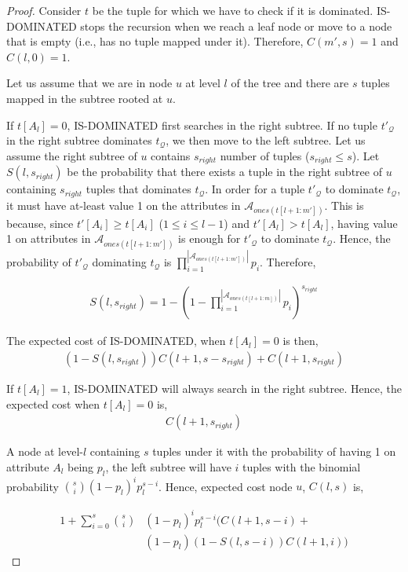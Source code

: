\begin{proof}
Consider $t$ be the tuple for which we have to check if it is dominated. IS-DOMINATED stops the recursion when we reach a leaf node or move to a node that is empty (i.e., has no tuple mapped under it). Therefore, $C(m', s) = 1$ and $C(l, 0) = 1$.

Let us assume that we are in node $u$ at level $l$ of the tree and there are $s$ tuples mapped in the subtree rooted at $u$. 

If $t[A_l] = 0$, IS-DOMINATED first searches in the right subtree. If no tuple $t'_\mathcal{Q}$ in the right subtree dominates $t_\mathcal{Q}$, we then move to the left subtree. Let us assume the right subtree of $u$ contains $s_{right}$ number of tuples ($s_{right} \leq s$). Let $S(l, s_{right})$ be the probability that there exists a tuple in the right subtree of $u$ containing $s_{right}$ tuples that dominates $t_\mathcal{Q}$. In order for a tuple $t'_\mathcal{Q}$ to dominate $t_\mathcal{Q}$, it must have at-least value 1 on the attributes in $\mathcal{A}_{ones(t[l+1:m'])}$. This is because, since $t'[A_i] \geq t[A_i]$ ($1 \leq i \leq l-1$) and $t'[A_l] > t[A_l]$, having value 1 on attributes in $\mathcal{A}_{ones(t[l+1:m'])}$ is enough for $t'_\mathcal{Q}$ to dominate $t_\mathcal{Q}$. Hence, the probability of $t'_\mathcal{Q}$ dominating $t_\mathcal{Q}$ is $\prod\nolimits_{i=1}^{|\mathcal{A}_{ones(t[l+1:m'])}|}p_i$. Therefore,

\begin{align}
    S(l, s_{right}) = 1 - (1 - \prod\nolimits_{i=1}^{|\mathcal{A}_{ones(t[l+1:m])}|}p_i)^{s_{right}}
\end{align}

The expected cost of IS-DOMINATED, when $t[A_l] = 0$ is then,
\begin{align}
    (1- S(l, s_{right})) C(l+1, s-s_{right}) + C(l+1, s_{right})
\end{align}

If $t[A_l] = 1$, IS-DOMINATED will always search in the right subtree. Hence, the expected cost when $t[A_l] = 0$ is,
\begin{align}
    C(l+1, s_{right})
\end{align}

A node at level-$l$ containing $s$ tuples under it with the probability of having 1 on attribute $A_l$ being $p_l$, the left subtree will have $i$ tuples with the binomial probability ${s \choose i} (1-p_l)^i p_l^{s-i}$. Hence, expected cost node $u$, $C(l, s)$ is,

\begin{align}
\nonumber
1 + \sum_{i=0}^s {s \choose i} & (1-p_l)^i p_l^{s-i} ( C(l+1, s-i) + \\
                               & (1-p_l)(1-S(l, s-i))C(l+1, i))
\end{align}
\end{proof}



